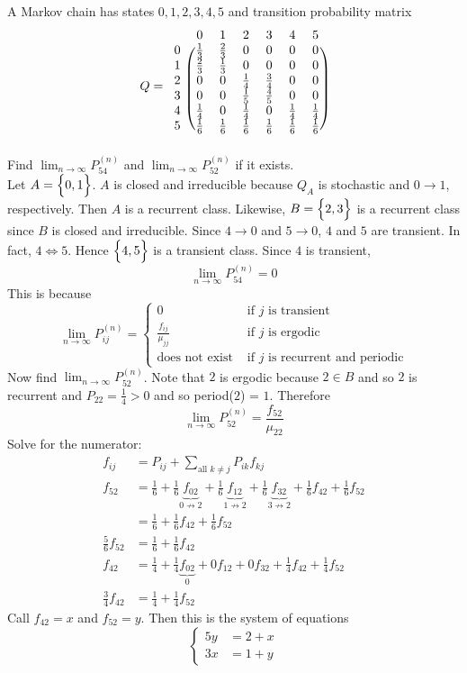 \documentclass[12pt]{article}
\begin{document}
A Markov chain has states $0,1,2,3,4,5$ and transition probability matrix $$ Q = \begin{blockarray}{ccccccc}
&0&1&2&3&4&5 \\
\begin{block}{c(cccccc)}
0 & \frac{1}{3} & \frac{2}{3} & 0 & 0 & 0 & 0 \\
1 & \frac{2}{3} & \frac{1}{3} & 0 & 0 & 0 & 0  \\ 
2 & 0 & 0 & \frac{1}{4} & \frac{3}{4} & 0 & 0  \\
3 & 0 & 0 & \frac{1}{5} & \frac{4}{5} & 0 & 0 \\ 
4 & \frac{1}{4} & 0 & \frac{1}{4} & 0 & \frac{1}{4} & \frac{1}{4} \\
5 & \frac{1}{6} & \frac{1}{6} & \frac{1}{6} & \frac{1}{6} & \frac{1}{6} & \frac{1}{6} \\ \end{block} \end{blockarray} $$
Find $\lim_{n\to\infty} P_{54}^{(n)}$ and $\lim_{n\to\infty} P_{52}^{(n)}$ if it exists. \\
Let $A = \Big\{ 0,1 \Big\}$. $A$ is closed and irreducible because $Q_A$ is stochastic and $0\to1$, respectively. Then $A$ is a recurrent class. Likewise, $B = \Big\{ 2,3 \Big\}$ is a recurrent class since $B$ is closed and irreducible. Since $4\to0$ and $5\to0$, $4$ and $5$ are transient. In fact, $4\iff 5$. Hence $\Big\{ 4,5 \Big\}$ is a transient class. Since $4$ is transient, $$\lim_{n\to\infty} P_{54}^{(n)} = 0 $$ This is because $$\lim_{n\to\infty} P_{ij}^{(n)} = \begin{cases} 0 &\text{ if $j$ is transient} \\ \frac{f_{ij}}{\mu_{jj}} &\text{ if $j$ is ergodic} \\ \text{does not exist} &\text{ if $j$ is recurrent and periodic} \end{cases} $$ 
Now find $\lim_{n\to\infty} P_{52}^{(n)}$. Note that $2$ is ergodic because $2\in B$ and so $2$ is recurrent and $P_{22} = \frac{1}{4} > 0$ and so period($2$) = $1$. Therefore $$ \lim_{n\to\infty} P_{52}^{(n)} = \frac{f_{52}}{\mu_{22}} $$ Solve for the numerator: $$ \begin{aligned} f_{ij} &= P_{ij} + \sum_{\text{all } k \neq j} P_{ik}f_{kj} \\ f_{52} &= \frac{1}{6} + \frac{1}{6}\underbrace{f_{02}}_{0\not\to2} + \frac{1}{6}\underbrace{f_{12}}_{1\not\to2} + \frac{1}{6}\underbrace{f_{32}}_{3\not\to2} + \frac{1}{6}f_{42} + \frac{1}{6}f_{52} \\ &= \frac{1}{6} + \frac{1}{6}f_{42} + \frac{1}{6}f_{52} \\ \frac{5}{6}f_{52} &= \frac{1}{6} + \frac{1}{6}f_{42} \\ f_{42} &= \frac{1}{4}  +\frac{1}{4}\underbrace{f_{02}}_0 + 0f_{12} + 0f_{32} + \frac{1}{4}f_{42} + \frac{1}{4}f_{52} \\ \frac{3}{4}f_{42} &= \frac{1}{4} + \frac{1}{4}f_{52} \end{aligned} $$ Call $f_{42} = x$ and $f_{52} = y$. Then this is the system of equations $$ \begin{cases} 5y &= 2 + x \\ 3x &= 1 + y \end{cases} $$ 
\end{document}
